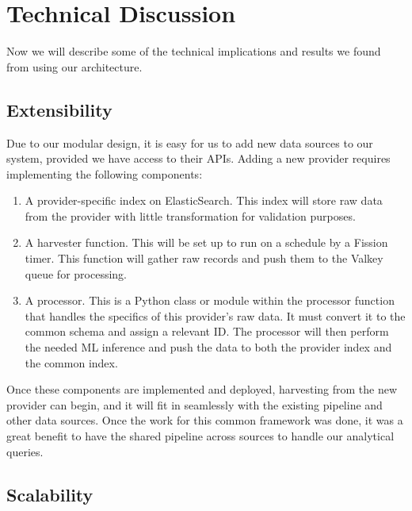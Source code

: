 

\section{Technical Discussion}\label{TechnicalDiscussion}

Now we will describe some of the technical implications and results we found from using our architecture.

\subsection{Extensibility}
Due to our modular design, it is easy for us to add new data sources to our system, provided we have access to their APIs. Adding a new provider requires implementing the following components:
\begin{enumerate}
	\item A provider-specific index on ElasticSearch. This index will store raw data from the provider with little transformation for validation purposes.
	
	\item A harvester function. This will be set up to run on a schedule by a Fission timer. This function will gather raw records and push them to the Valkey queue for processing.
	
	\item A processor. This is a Python class or module within the processor function that handles the specifics of this provider's raw data. It must convert it to the common schema and assign a relevant ID. The processor will then perform the needed ML inference and push the data to both the provider index and the common index.
\end{enumerate}
Once these components are implemented and deployed, harvesting from the new provider can begin, and it will fit in seamlessly with the existing pipeline and other data sources. Once the work for this common framework was done, it was a great benefit to have the shared pipeline across sources to handle our analytical queries.

\subsection{Scalability}

